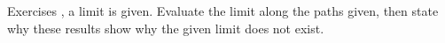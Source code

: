 {\noindent Exercises}
{, a limit is given. Evaluate the limit along the paths given, then state why these results show why the given limit does not exist.}
